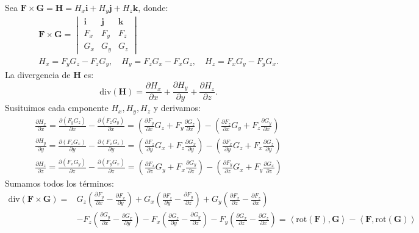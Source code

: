 \begin{enumerate}[label=\color{red}\textbf{\arabic*)}]
\begin{enumerate}[label=\color{red}\textbf{\alph*)}]
      Sea $\mathbf{F} \times \mathbf{G} =\mathbf{H}=H_x\mathbf{i} +H_y\mathbf{j} +H_z\mathbf{k} $, donde: \[
      \begin{array}{c}
      \mathbf{F} \times \mathbf{G} =\begin{vmatrix} 
        \mathbf{i}  & \mathbf{j}  & \mathbf{k} \\
        F_x & F_y & F_z\\
        G_x & G_y & G_z
      \end{vmatrix}\\
      H_x=F_yG_z-F_zG_y,\quad H_y=F_zG_x-F_xG_z,\quad H_z=F_xG_y-F_yG_x.
      \end{array}
      \] 
      La divergencia de $\mathbf{H}$ es:
      \[
      \mathrm{div} (\mathbf{H})=\frac{\partial H_x}{\partial x} +\frac{\partial H_y}{\partial y} +\frac{\partial H_z}{\partial z} .
      \] 
      Susituimos cada cmponente $H_x,H_y,H_z$ y derivamos:
       \[
      \begin{array}{l}
        \frac{\partial H_x}{\partial x} =\frac{\partial (F_yG_z)}{\partial x} -\frac{\partial (F_zG_y)}{\partial x} =\left( \frac{\partial F_y}{\partial x} G_z+F_y \frac{\partial G_z}{\partial x}  \right) - \left( \frac{\partial F_z}{\partial x} G_y+F_z \frac{\partial G_y}{\partial x}  \right)\\
        \frac{\partial H_y}{\partial y} =\frac{\partial (F_zG_x)}{\partial y} -\frac{\partial (F_xG_z)}{\partial y} =\left( \frac{\partial F_z}{\partial y} G_x+F_z \frac{\partial G_x}{\partial y}  \right) -\left( \frac{\partial F_x}{\partial y} G_z+F_x \frac{\partial G_z}{\partial y}  \right) \\
        \frac{\partial H_z}{\partial z} =\frac{\partial (F_xG_y)}{\partial z} -\frac{\partial (F_yG_x)}{\partial z} =\left( \frac{\partial F_x}{\partial z} G_y+F_x \frac{\partial G_y}{\partial z}  \right) - \left( \frac{\partial F_y}{\partial z} G_x+F_y \frac{\partial G_x}{\partial z}  \right)
      \end{array}
      \] 
      Sumamos todos los términos:
      \[
      \begin{aligned}
      \mathrm{div} (\mathbf{F} \times \mathbf{G} )=&G_z\left( \frac{\partial F_y}{\partial x}-\frac{\partial F_x}{\partial y}   \right) +G_x\left( \frac{\partial F_z}{\partial y} -\frac{\partial F_y}{\partial z}  \right) +G_y\left( \frac{\partial F_x}{\partial z} -\frac{\partial F_z}{\partial x}  \right)\\
      & -F_z\left( \frac{\partial G_y}{\partial x} -\frac{\partial G_x}{\partial y}  \right) -F_x\left( \frac{\partial G_z}{\partial y} -\frac{\partial G_y}{\partial z}  \right) -F_y\left( \frac{\partial G_x}{\partial z} -\frac{\partial G_z}{\partial x}  \right) =\left<\mathrm{rot} (\mathbf{F} ),\mathbf{G}  \right>-\left<\mathbf{F} ,\mathrm{rot} (\mathbf{G} ) \right>

\end{aligned}\]
\end{enumerate}
\end{enumerate}
